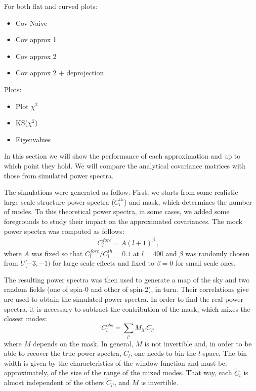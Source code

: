 \documentclass[useAMS,usenatbib]{mn2e}
\newcommand{\clth}{C_l^{th}}
\newcommand{\clf}{C_l^{fore}}
\begin{document}
For both flat and curved plots:
\begin{itemize}
\item Cov Naive
\item Cov approx 1
\item Cov approx 2
\item Cov approx 2 + deprojection
\end{itemize}

Plots:
\begin{itemize}
\item Plot $\chi^2$
\item KS($\chi^2$)
\item Eigenvalues
\end{itemize}

In this section we will show the performance of each approximation and up to
which point they hold. We will compare the analytical covariance matrices with
those from simulated power spectra. 

The simulations were generated as follow. First, we starts from some realistic
large scale structure power spectra ($\clth$) and mask, which determines the
number of modes. To this theoretical power spectra, in some cases, we
added some foregrounds to study their impact on the approximated covariances.
The mock power spectra was computed as follows:
\begin{eqnarray}
  \clf = A (l + 1)^\beta\,,
\end{eqnarray}
where $A$ was fixed so that $\clf/\clth = 0.1$ at $l=400$ and $\beta$ was
randomly chosen from $U[-3, -1)$ for large scale effects and fixed to $\beta =
0$ for small scale ones.

The resulting power spectra was then used to generate a map of the sky and
two random fields (one of spin-0 and other of spin-2), in turn. Their
correlations give  are used to obtain the simulated power spectra. In order to
find the real power spectra, it is necessary to subtract the contribution of
the mask, which mixes the closest modes:
\begin{equation}
  C^{obs}_l = \sum_{l'} M_{ll'} C_{l'}\,
\end{equation}
where $M$ depends on the mask. In general, $M$ is not invertible and, in order
to be able to recover the true power spectra, $C_l$, one needs to bin the
$l$-space. The bin width is given by the characteristics of the window
function and must be, approximately, of the size of the range of the mixed
modes. That way, each $\tilde C_l$ is almost independent of the others
$\tilde C_{l'}$, and $M$ is invertible.
\end{document}

